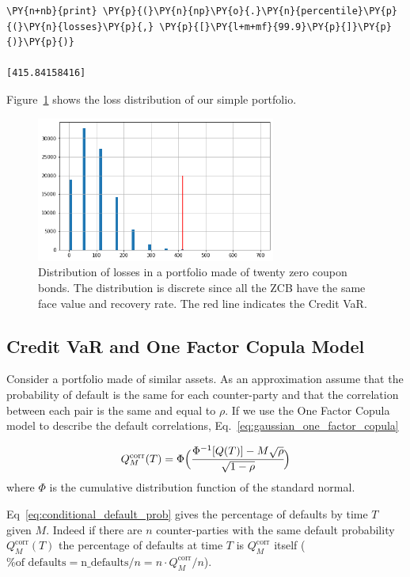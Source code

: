 \begin{codebox}
\begin{Verbatim}[commandchars=\\\{\}]
\PY{n+nb}{print} \PY{p}{(}\PY{n}{np}\PY{o}{.}\PY{n}{percentile}\PY{p}{(}\PY{n}{losses}\PY{p}{,} \PY{p}{[}\PY{l+m+mf}{99.9}\PY{p}{]}\PY{p}{)}\PY{p}{)}

[415.84158416]
\end{Verbatim}
\end{codebox}
\noindent
Figure~\ref{fig:credit_var} shows the loss distribution of our simple portfolio.

\begin{figure}[htb]
\centering
\includegraphics[width=0.7\textwidth]{figures/credit_var_zcb.png}
\caption{Distribution of losses in a portfolio made of twenty zero coupon bonds. The distribution is discrete since all the ZCB have the same face value and recovery rate. The red line indicates the Credit VaR.}
\label{fig:credit_var}
\end{figure}

\subsection{Credit VaR and One Factor Copula Model}
Consider a portfolio made of similar assets. As an approximation assume that the probability of default is the same for each counter-party and that the correlation between each pair is the same and equal to $\rho$. If we use the One Factor Copula model to describe the default correlations, Eq.~\ref{eq:gaussian_one_factor_copula}

\begin{equation}
Q^{\textrm{corr}}_M(T) = \Phi\Big(\cfrac{\Phi^{-1}[Q(T)]-M\sqrt{\rho}}{\sqrt{1-\rho}}\Big)
\label{eq:conditional_default_prob}
\end{equation}
where $\Phi$ is the cumulative distribution function of the standard normal.

Eq~\ref{eq:conditional_default_prob} gives the percentage of defaults by time $T$ given $M$. Indeed if there are $n$ counter-parties with the same default probability $Q^{\textrm{corr}}_M(T)$ the percentage of defaults at time $T$ is $Q^{\textrm{corr}}_M$ itself ($\textrm{\% of defaults} = \textrm{n\_defaults}/n = n\cdot Q^{\textrm{corr}}_M/n$).

